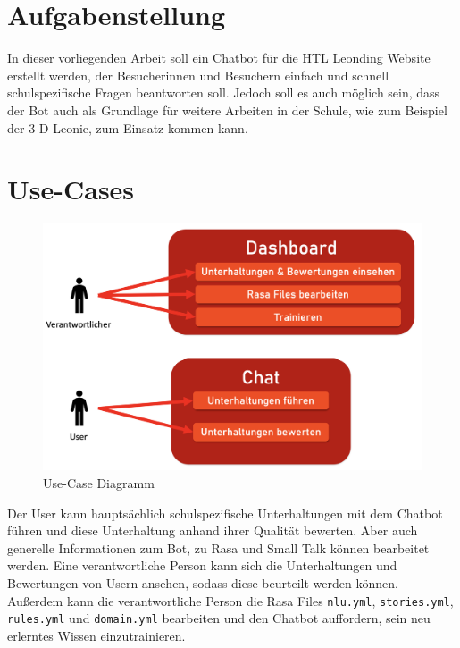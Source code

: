 \section{Aufgabenstellung}
In dieser vorliegenden Arbeit soll ein Chatbot für die HTL Leonding Website erstellt werden, der Besucherinnen und Besuchern einfach und schnell schulspezifische Fragen beantworten soll.
Jedoch soll es auch möglich sein, dass der Bot auch als Grundlage für weitere Arbeiten in der Schule, wie zum Beispiel der 3-D-Leonie, zum Einsatz kommen kann.

\section{Use-Cases}

\begin{figure}[hbt!]
    \centering
    \includegraphics[scale=0.5]{pics/usecase}
    \caption{Use-Case Diagramm}
    \label{fig:impl:usecase}
\end{figure}

Der User kann hauptsächlich schulspezifische Unterhaltungen mit dem Chatbot führen und diese Unterhaltung anhand ihrer Qualität bewerten.
Aber auch generelle Informationen zum Bot, zu Rasa und Small Talk können bearbeitet werden.
Eine verantwortliche Person kann sich die Unterhaltungen und Bewertungen von Usern ansehen, sodass diese beurteilt werden können.
Außerdem kann die verantwortliche Person die Rasa Files \texttt{nlu.yml}, \texttt{stories.yml}, \texttt{rules.yml} und \texttt{domain.yml} bearbeiten und den Chatbot auffordern, sein neu erlerntes Wissen einzutrainieren.
